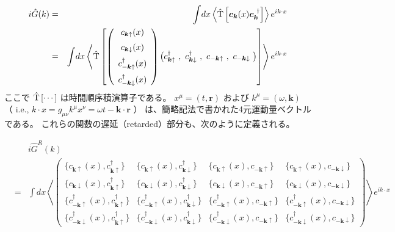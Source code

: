 \documentclass[uplatex,a4j,12pt,dvipdfmx]{jsarticle}
\begin{document}
\begin{eqnarray}
	i
	\hat{G}(k)
	&=&
	\int \! dx
	\left\langle \hat{\rm T} \left[ \bm{c}_{\bm{k}}(x) \bm{c}_{\bm{k}}^{\ \dagger} \right] \right\rangle
	e^{ i k \cdot x }
	\nonumber \\ &=&
	\int \! dx
	\left\langle \hat{\rm T} \left[
		\left(
		\begin{array}{c}
				c_{\bm{k} \uparrow}(x)            \\[2mm]
				c_{\bm{k} \downarrow}(x)          \\[2mm]
				c^{\dagger}_{-\bm{k} \uparrow}(x) \\[2mm]
				c^{\dagger}_{-\bm{k} \downarrow}(x)
			\end{array}
		\right)
		\big( c^{\dagger}_{\bm{k} \uparrow} \ , \ c^{\dagger}_{\bm{k} \downarrow} \ , \ c_{-\bm{k} \uparrow} \ , \ c_{-\bm{k} \downarrow}  \big)
		\right]
	\right\rangle
	e^{ i k \cdot x }
\end{eqnarray}
%
ここで $\hat{\rm T} \left[ \cdots \right]$ は時間順序積演算子である。
$x^{\mu}=(t,\bm{r})$ および $k^{\mu}=(\omega,\bm{k})$
（ i.e., $k \cdot x = g_{\mu \nu} k^{\mu} x^{\nu} = \omega t- \bm{k} \cdot \bm{r}$ ）
は、簡略記法で書かれた4元運動量ベクトルである。
これらの関数の遅延（retarded）部分も、次のように定義される。

\begin{eqnarray}
	&&
	i
	\hat{G}^{R}(k)
	\nonumber \\ &=&
	\int \! dx
	\left\langle
	\left(
	\begin{array}{cccc}
			\{ c_{\bm{k}\uparrow}(x), c_{\bm{k}\uparrow}^{\dagger} \}                & \{ c_{\bm{k}\uparrow}(x), c^{\dagger}_{\bm{k} \downarrow} \}               & \{ c_{\bm{k} \uparrow}(x), c_{-\bm{k} \uparrow} \}              & \{ c_{\bm{k} \uparrow}(x), c_{-\bm{k} \downarrow} \}
			\\[3mm]
			\{ c_{\bm{k} \downarrow}(x), c_{\bm{k}\uparrow}^{\dagger} \}             & \{ c_{\bm{k} \downarrow}(x), c^{\dagger}_{\bm{k} \downarrow} \}            & \{ c_{\bm{k} \downarrow}(x), c_{-\bm{k} \uparrow} \}            & \{ c_{\bm{k} \downarrow}(x), c_{-\bm{k} \downarrow} \}
			\\[3mm]
			\{ c^{\dagger}_{-\bm{k} \uparrow}(x), c^{\dagger}_{\bm{k} \uparrow} \}   & \{ c^{\dagger}_{-\bm{k} \uparrow}(x), c^{\dagger}_{\bm{k} \downarrow} \}   & \{ c^{\dagger}_{-\bm{k} \uparrow}(x), c_{-\bm{k} \uparrow} \}   & \{ c^{\dagger}_{-\bm{k} \uparrow}(x), c_{-\bm{k} \downarrow} \}
			\\[3mm]
			\{ c^{\dagger}_{-\bm{k} \downarrow}(x), c^{\dagger}_{\bm{k} \uparrow} \} & \{ c^{\dagger}_{-\bm{k} \downarrow}(x), c^{\dagger}_{\bm{k} \downarrow} \} & \{ c^{\dagger}_{-\bm{k} \downarrow}(x), c_{-\bm{k} \uparrow} \} & \{ c^{\dagger}_{-\bm{k} \downarrow}(x), c_{-\bm{k} \downarrow} \}
		\end{array}
	\right)
	\right\rangle
	e^{ i k \cdot x }
\end{eqnarray}
%
\end{document}
